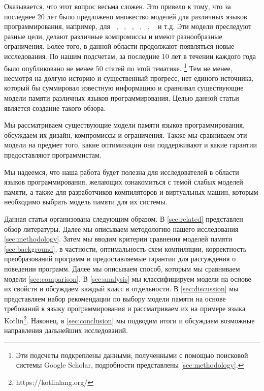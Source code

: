 Оказывается, что этот вопрос весьма сложен.
Это привело к тому, что за последнее 20 лет было предложено 
множество моделей для различных языков программирования, например, для 
\Java~\cite{Manson-al:POPL05, Bender-Palsberg:OOPSLA19}, \CPP~\cite{Batty-al:POPL11}, 
\LLVM~\cite{Chakraborty-Vafeiadis:CGO17}, \JS~\cite{Watt-al:PLDI2020}, 
\OCaml~\cite{Manson-al:POPL05}, \Haskell~\cite{Vollmer-al:PPoPP17} и т.д.
Эти модели преследуют разные цели, делают различные компромиссы
и имеют разнообразные ограничения.
Более того, в данной области продолжают появляться новые исследования. 
По нашим подсчетам, за последние 10 лет в течении 
каждого года было опубликовано не менее 50 статей по этой тематике.%
\footnote{Эти подсчеты подкреплены данными, полученными 
с помощью поисковой системы Google Scholar, 
подробности представлены \cref{sec:methodology}.}
Тем не менее, несмотря на долгую историю и существенный прогресс,
нет единого источника, который бы суммировал 
известную информацию и сравнивал существующие 
модели памяти различных языков программирования. 
Целью данной статьи является создание такого обзора. 

Мы рассматриваем существующие модели памяти языков программирования, 
обсуждаем их дизайн, компромиссы и ограничения. 
Также мы сравниваем эти модели на предмет того,
какие оптимизации они поддерживают 
и какие гарантии предоставляют программистам. 

Мы надеемся, что наша работа будет полезна для 
исследователей в области языков программирования, 
желающих ознакомиться с темой слабых моделей памяти, 
а также для разработчиков компиляторов и виртуальных машин, 
которым необходимо выбрать модель памяти для их системы.

Данная статья организована следующим образом. 
В \cref{sec:related} представлен обзор литературы. 
Далее мы описываем методологию нашего исследования \cref{sec:methodology}.
Затем мы вводим критерии сравнения моделей памяти \cref{sec:background}, 
в частности, оптимальность схем компиляции, 
корректность преобразований программ
и предоставляемые гарантии для рассуждения 
о поведении программ. 
Далее мы описываем способ, которым мы 
сравниваем модели \cref{sec:comparison}. 
В \cref{sec:analysis} мы классифицируем модели на основе их свойств
и обсуждаем каждый класс в отдельности. 
В \cref{sec:discussion} мы представляем набор рекомендации 
по выбору модели памяти на основе требований к языку программирования 
и рассматриваем их на примере языка Kotlin\footnote{https://kotlinlang.org/}.
Наконец, в \cref{sec:conclusion} мы подводим итоги 
и обсуждаем возможные направления дальнейших исследований.

